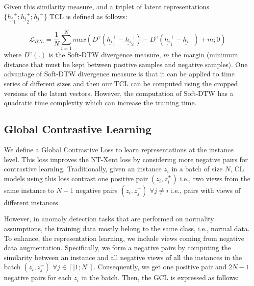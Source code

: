
Given this similarity measure, and a triplet of latent representations $\{\underline{h_i}_1^+; \underline{h_i}_2^+; \underline{h_i}^-\}$ TCL is defined as follows:

\begin{equation}\label{temp_loss}
    \mathcal{L}_{TCL} = \frac{1}{N} \sum_{i=1}^{N} max(D^{\gamma}(\underline{h_i}_1^+ - \underline{h_i}_2^+) - D^{\gamma}(\underline{h_i}_1^+ - \underline{h_i}^-) + m; 0)
\end{equation}
where $D^{\gamma}(.)$ is the Soft-DTW divergence measure, $m$ the margin (minimum distance that must be kept between positive samples and negative samples). One advantage of Soft-DTW divergence measure is that it can be applied to time series of different sizes and then our TCL can be computed using the cropped versions of the latent vectors. However, the computation of Soft-DTW has a quadratic time complexity which can increase the training time.


\subsection{Global Contrastive Learning}
We define a Global Contrastive Loss to learn representations at the instance level. This loss improves the NT-Xent loss by considering more negative pairs for contrastive learning. Traditionally, given an instance $z_i$ in a batch of size $N$, CL models using this loss contrast one positive pair $(z_i, z_i^+)$ i.e., two views from the same instance to $N-1$ negative pairs $(z_i, z_j^{+})$ $\forall j \neq i$ i.e., pairs with views of different instances. 

However, in anomaly detection tasks that are performed on normality assumptions, the training data mostly belong to the same class, i.e., normal data. To enhance, the representation learning, we include views coming from negative data augmentation. Specifically, we form a negative pairs by computing the similarity between an instance and all negative views of all the instances in the batch $(z_i, z_j^{-})$ $\forall j \in [|1;N|]$. Consequently, we get one positive pair and $2N-1$ negative pairs for each $z_i$ in the batch. Then, the GCL is expressed as follows:


